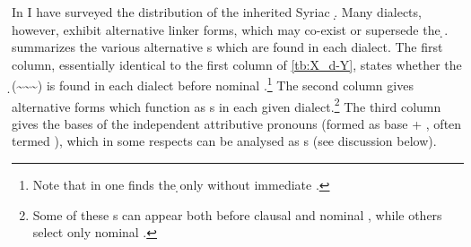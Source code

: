 In  I have surveyed the distribution of the inherited Syriac \lnk* \d. Many dialects, however, exhibit alternative linker forms, which may co-exist or supersede the \d \lnk*.  summarizes the various alternative \lnk*s which are found in each dialect. The first column, essentially identical to the first column of \vref{tb:X_d-Y}, states whether the \d \lnk* (\~\~\~) is found in each dialect before nominal \secns.\footnote{Note that in \Her one finds the \d \lnk* only without immediate \prims.} The second column gives alternative forms which function as \lnk*s in each given dialect.\footnote{Some of these \lnk*s can appear both before clausal and nominal \secns, while others select only nominal \secns.} The third column gives the bases of the independent attributive pronouns (formed as base + , often termed ), which in some respects can be analysed as \lnk*s (see discussion below).


